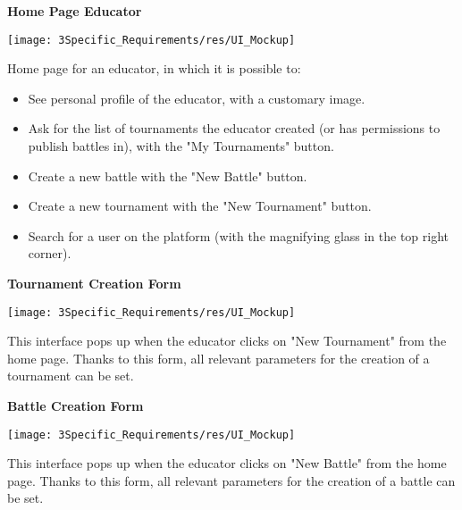 \vspace{1cm}

\begin{minipage}{\linewidth}
	\textbf{Home Page Educator}
	\begin{center}
		\texttt{[image: 3Specific\_Requirements/res/UI\_Mockup]}
		
	\end{center}
	Home page for an educator, in which it is possible to:
	\begin{itemize}
		\item See personal profile of the educator, with a customary image.
		\item Ask for the list of tournaments the educator created (or has permissions to publish battles in), with the "My Tournaments" button.
		\item Create a new battle with the "New Battle" button. 
		\item Create a new tournament with the "New Tournament" button.
		\item Search for a user on the platform (with the magnifying glass in the top right corner). 
	\end{itemize}
\end{minipage}

\vspace{1cm}

\begin{minipage}{\linewidth}
	\textbf{Tournament Creation Form}
	\begin{center}
		\texttt{[image: 3Specific\_Requirements/res/UI\_Mockup]}
		
	\end{center}
 	This interface pops up when the educator clicks on "New Tournament" from the home page. Thanks to this form, all relevant parameters for the creation of a tournament can be set.

\end{minipage}

\vspace{1cm}

\begin{minipage}{\linewidth}
	\textbf{Battle Creation Form}
	\begin{center}
		\texttt{[image: 3Specific\_Requirements/res/UI\_Mockup]}
		
	\end{center}
	This interface pops up when the educator clicks on "New Battle" from the home page. Thanks to this form, all relevant parameters for the creation of a battle can be set.
	
\end{minipage}
